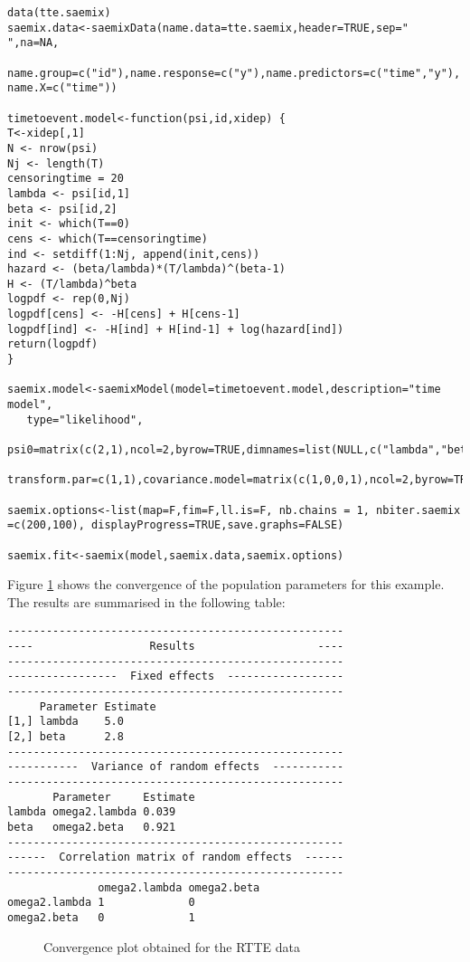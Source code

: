 \begin{verbatim}
data(tte.saemix)
saemix.data<-saemixData(name.data=tte.saemix,header=TRUE,sep=" ",na=NA,
   name.group=c("id"),name.response=c("y"),name.predictors=c("time","y"), name.X=c("time"))

timetoevent.model<-function(psi,id,xidep) {
T<-xidep[,1]
N <- nrow(psi)
Nj <- length(T)
censoringtime = 20
lambda <- psi[id,1]
beta <- psi[id,2]
init <- which(T==0)
cens <- which(T==censoringtime)
ind <- setdiff(1:Nj, append(init,cens))
hazard <- (beta/lambda)*(T/lambda)^(beta-1)
H <- (T/lambda)^beta
logpdf <- rep(0,Nj)
logpdf[cens] <- -H[cens] + H[cens-1]
logpdf[ind] <- -H[ind] + H[ind-1] + log(hazard[ind])
return(logpdf)
}

saemix.model<-saemixModel(model=timetoevent.model,description="time model",
   type="likelihood",
   psi0=matrix(c(2,1),ncol=2,byrow=TRUE,dimnames=list(NULL,c("lambda","beta"))),
   transform.par=c(1,1),covariance.model=matrix(c(1,0,0,1),ncol=2,byrow=TRUE))

saemix.options<-list(map=F,fim=F,ll.is=F, nb.chains = 1, nbiter.saemix =c(200,100), displayProgress=TRUE,save.graphs=FALSE)

saemix.fit<-saemix(model,saemix.data,saemix.options)

\end{verbatim}

Figure \ref{fig:popTTE} shows the convergence of the population parameters for this example. The results are summarised in the following table:

\begin{verbatim}
----------------------------------------------------
----                  Results                   ----
----------------------------------------------------
-----------------  Fixed effects  ------------------
----------------------------------------------------
     Parameter Estimate
[1,] lambda    5.0     
[2,] beta      2.8     
----------------------------------------------------
-----------  Variance of random effects  -----------
----------------------------------------------------
       Parameter     Estimate
lambda omega2.lambda 0.039   
beta   omega2.beta   0.921   
----------------------------------------------------
------  Correlation matrix of random effects  ------
----------------------------------------------------
              omega2.lambda omega2.beta
omega2.lambda 1             0          
omega2.beta   0             1 
\end{verbatim}


\begin{figure}[!h]
\begin{center}
\par \kern -1cm
\end{center}
\par \kern -0.5cm
\caption{Convergence plot obtained for the RTTE data} \label{fig:popTTE}
\end{figure}

